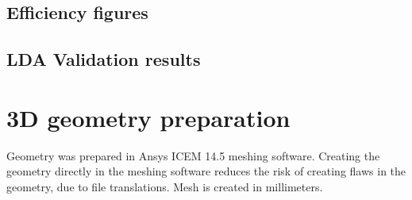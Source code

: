 \subsection{Efficiency figures}

\subsection{LDA Validation results}

\section{3D geometry preparation} \label{3dgeom}
Geometry was prepared in Ansys ICEM 14.5 meshing software. Creating the geometry directly in the meshing software reduces the risk of creating flaws in the geometry, due to file translations. Mesh is created in millimeters.

